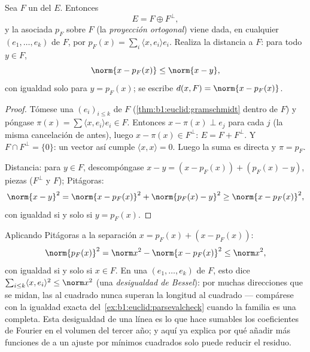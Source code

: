 \begin{theorem}\label{thm:b1:euclid:projection}
Sea $F$ un  del  $E$. Entonces
\[
E = F \oplus F^{\perp},
\]
y la  asociada $p_F$ sobre $F$ (la \emph{proyección
ortogonal}) viene dada, en cualquier
  $(e_1, \dots, e_k)$ de $F$, por
$p_F(x) = \sum_i \langle x, e_i\rangle e_i$. Realiza la distancia a
$F$: para todo $y \in F$,
\[
\norm{x - p_F(x)} \leq \norm{x - y},
\]
con igualdad solo para $y = p_F(x)$; se escribe
$d(x, F) = \norm{x - p_F(x)}$.
\end{theorem}

\begin{proof}
Tómese una   $(e_i)_{i \leq k}$ de $F$
(\cref{thm:b1:euclid:gramschmidt} dentro de $F$) y póngase
$\pi(x) = \sum \langle x, e_i\rangle e_i \in F$. Entonces
$x - \pi(x) \perp e_j$ para cada $j$ (la misma cancelación de antes),
luego $x - \pi(x) \in F^\perp$: $E = F + F^\perp$. Y
$F \cap F^\perp = \{0\}$: un vector así cumple
$\langle x, x\rangle = 0$. Luego la suma es directa y $\pi = p_F$.

Distancia: para $y \in F$, descompóngase
$x - y = (x - p_F(x)) + (p_F(x) - y)$, piezas 
($F^\perp$ y $F$); Pitágoras:
\[
\norm{x - y}^2 = \norm{x - p_F(x)}^2 + \norm{p_F(x) - y}^2
\geq \norm{x - p_F(x)}^2,
\]
con igualdad si y solo si $y = p_F(x)$.
\end{proof}

\begin{example}
\label{ex:b1:euclid:bessel}
Aplicando Pitágoras a la separación $x = p_F(x) + (x - p_F(x))$:
\[
\norm{p_F(x)}^2 = \norm x^2 - \norm{x - p_F(x)}^2 \leq
\norm x^2 ,
\]
con igualdad si y solo si $x \in F$. En una  
$(e_1, \dots, e_k)$ de $F$, esto dice
$\sum_{i \leq k}\langle x, e_i\rangle^2 \leq \norm x^2$ (una
\emph{desigualdad de Bessel}): por muchas direcciones 
que se midan, las  al cuadrado nunca superan la longitud
al cuadrado --- compárese con la igualdad exacta
del~\cref{ex:b1:euclid:parsevalcheck} cuando la familia es una 
completa. Esta desigualdad de una línea es lo que hace sumables los
coeficientes de Fourier en el volumen del tercer año; y aquí ya
explica por qué añadir más funciones de  a un ajuste por mínimos
cuadrados solo puede reducir el residuo.
\end{example}

